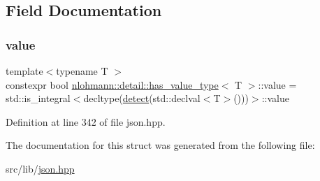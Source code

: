 \subsection{Field Documentation}
\mbox{\label{structnlohmann_1_1detail_1_1has__value__type_a30f340b25fe9dbb525c7675ae4df94e6}} 
\subsubsection{\texorpdfstring{value}{value}}
{\footnotesize\ttfamily template$<$typename T $>$ \\
constexpr bool \hyperlink{structnlohmann_1_1detail_1_1has__value__type}{nlohmann\+::detail\+::has\+\_\+value\+\_\+type}$<$ T $>$\+::value = std\+::is\+\_\+integral$<$decltype(\hyperlink{structnlohmann_1_1detail_1_1has__value__type_a42b4183da4cb26f67fb15247dcc1f067}{detect}(std\+::declval$<$T$>$()))$>$\+::value\hspace{0.3cm}{\ttfamily [static]}}



Definition at line 342 of file json.\+hpp.



The documentation for this struct was generated from the following file\+:\begin{DoxyCompactItemize}
\item 
src/lib/\hyperlink{json_8hpp}{json.\+hpp}\end{DoxyCompactItemize}
